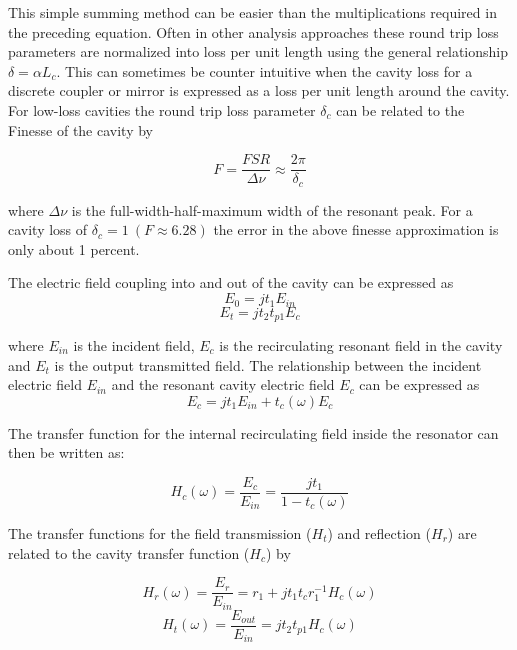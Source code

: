 \documentclass[10pt]{article}
\begin{document}
\noindent  This simple summing method can be easier than the multiplications  required in the preceding equation.  Often in other analysis approaches these round trip loss parameters are normalized into loss per unit length using the general relationship $\delta = \alpha L_c $.  This can sometimes be counter intuitive when the cavity loss for a discrete coupler or mirror is expressed as a loss per unit length around the cavity.   For low-loss cavities the round trip loss parameter $\delta_c$ can be related to  the Finesse of the cavity by 

\begin{equation} 
F = \frac{FSR}{\Delta\nu}  \approx \frac{2\pi}{\delta_c} 
\label{eq:F}
\end{equation}  

\noindent  where $\Delta\nu$ is the full-width-half-maximum width of the resonant peak.   For a cavity loss of  $ \delta_c = 1 ~ (F \approx 6.28) $ the error in the above finesse approximation is only about 1 percent.


The electric field coupling into and out of the cavity can be expressed as
\begin{equation} E_0 = j t_1 E_{in} \end{equation}
\begin{equation} E_{t} = j t_2 t_{p1} E_c \end{equation}

\noindent      where $E_{in}$ is the incident field, $E_{c}$ is the recirculating resonant field in the cavity and $E_t$ is the output transmitted field.    The relationship between the incident electric field $E_{in}$ and the resonant cavity electric field $E_c$ can be expressed as
\begin{equation} E_c = jt_1E_{in}+t_c(\omega)E_c  \end{equation}  

\noindent  The transfer function for the internal recirculating field inside the resonator can then be written as:

\begin{equation}
\boxed{ H_c(\omega) = \frac{E_{c}}{E_{in}} = \frac{jt_1}{1-t_c(\omega)}  }      
\label{eq:Hc}
\end{equation}
 
 

The transfer functions for the field transmission ($H_t$) and reflection ($H_r$) are related to the cavity transfer function ($H_c$) by


\begin{equation} 
H_r(\omega) = \frac{E_{r}}{E_{in}} = r_1 + j t_1 t_c r_1^{-1} H_c(\omega) 
\label{eq:Hr}
\end{equation}
\begin{equation} 
H_t(\omega) = \frac{E_{out}}{E_{in}} = j t_2 t_{p1} H_c(\omega)
\label{eq:Ht} 
\end{equation}
\end{document}
